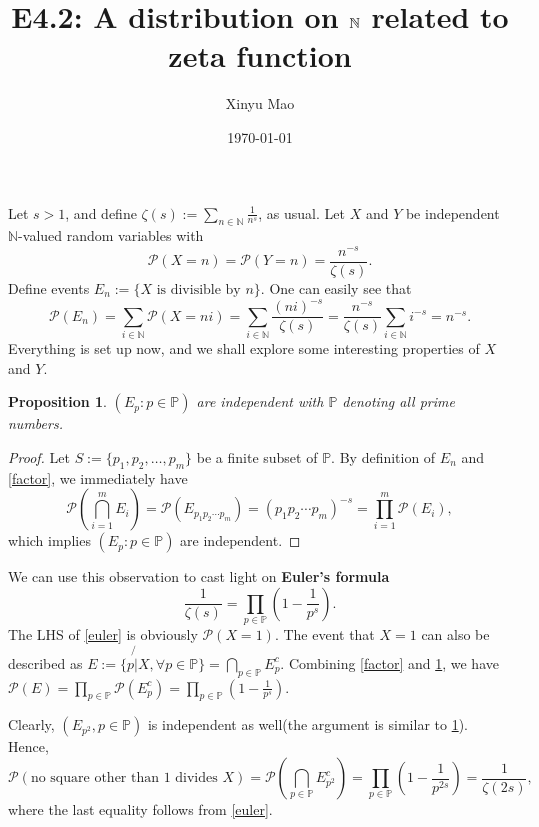 \documentclass[12pt]{article}
\title{E4.2: A distribution on $\N$ related to zeta function}
\author{Xinyu Mao}
\date{\today}
\newtheorem{proposition}[theorem]{Proposition}
\newcommand\N{\mathbb{N}}
\newcommand\pp{\mathcal{P}}
\newcommand\PP{\mathbb{P}}
\newcommand\pr[1]{\mathcal{P} \left( #1\right)}
\begin{document}
\maketitle

Let $s > 1$, and define $\zeta(s) := \sum_{n \in \N} \frac{1}{n^s}$, as usual. 
Let $X$ and $Y$ be independent $\N$-valued random variables with
$$
    \pp(X = n) = \pp(Y = n) = \frac{n^{-s}}{\zeta(s)}.
$$
Define events $E_n := \{ \text{$X$ is divisible by $n$}\}$.
One can easily see that 
\begin{equation} \label{factor}
    \pp(E_n) = \sum_{i \in \N} \pp(X = ni) 
    = \sum_{i \in \N} \frac{(ni)^{-s}}{\zeta(s)}
    = \frac{n^{-s}}{\zeta(s)} \sum_{i \in \N} i^{-s}= n^{-s}.
\end{equation}
Everything is set up now, and we shall explore some interesting properties of 
$X$ and $Y$.

\begin{proposition} \label{ind}
    $(E_p : p \in \PP)$ are independent with $\PP$ denoting all prime numbers.
\end{proposition}
\begin{proof}
    Let $S := \{p_1,p_2,\dots,p_m\}$ be a finite subset of $\PP$.
    By definition of $E_n$ and \cref{factor}, we immediately have 
    $$
        \pr{\bigcap_{i = 1}^m E_i} = \pr{E_{p_1p_2\cdots p_m}}
        = (p_1p_2\cdots p_m)^{-s} = \prod_{i = 1}^m\pp(E_i),
    $$
    which implies  $(E_p : p \in \PP)$ are independent.
\end{proof}

We can use this observation to cast light on \textbf{Euler's formula}
\begin{equation} \label{euler}
    \frac{1}{\zeta(s)} = \prod_{p \in \PP} (1 - \frac{1}{p^s}).
\end{equation}
The LHS of \cref{euler} is obviously $\pp(X = 1)$. 
The event that $X = 1$ can also be described as 
$E := \{p \not{|} X, \forall p \in \PP\} = \bigcap_{p \in \PP}E_p^c$.
Combining \cref{factor} and \cref{ind}, 
we have $\pp(E) = \prod_{p\in \PP} \pp(E_p^c) = 
\prod_{p \in \PP} (1 - \frac{1}{p^s})$.

Clearly, $(E_{p^2},p \in \PP)$ is independent as well(the argument is similar to \cref{ind}).
Hence,
$$
    \pp(\text{no square other than 1 divides $X$}) 
    = \pr{\bigcap_{p \in \PP} E_{p^2}^c} 
    = \prod_{p \in \PP} (1 - \frac{1}{p^{2s}}) = \frac{1}{\zeta(2s)},
$$ 
where the last equality follows from \cref{euler}.
\end{document}
